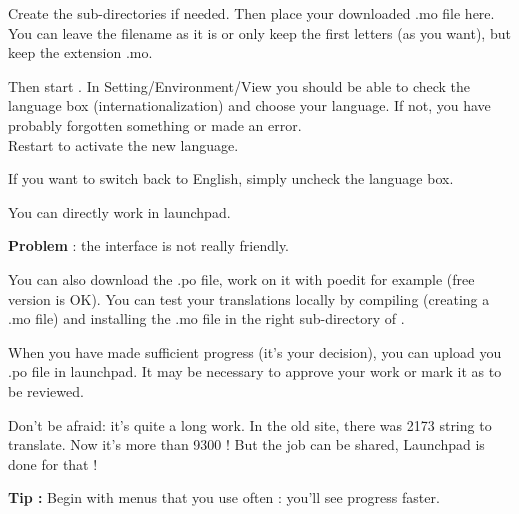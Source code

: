 Create the sub-directories if needed. Then place your downloaded .mo file here. You can leave the filename as it is or only keep the first letters (as you want), but keep the extension .mo.

Then start \codeblocks. In Setting/Environment/View you should be able to check the language box (internationalization) and choose your language. If not, you have probably forgotten something or made an error.\\
Restart \codeblocks to activate the new language.

If you want to switch back to English, simply uncheck the language box.

You can directly work in launchpad.

\textbf{Problem} : the interface is not really friendly.

You can also download the .po file, work on it with poedit for example (free version is OK). You can test your translations locally by compiling (creating a .mo file) and installing the .mo file in the right sub-directory of \codeblocks.

When you have made sufficient progress (it's your decision), you can upload you .po file in launchpad. It may be necessary to approve your work or mark it as to be reviewed.

Don't be afraid: it's quite a long work. In the old site, there was 2173 string to translate. Now it's more than 9300 ! But the job can be shared, Launchpad is done for that !

\textbf{Tip :} Begin with menus that you use often : you'll see progress faster.

